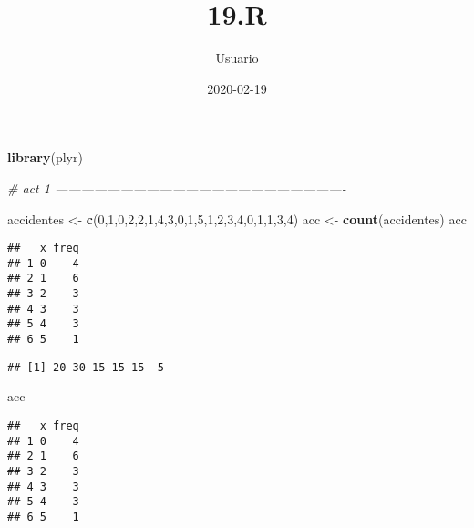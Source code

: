 \documentclass[
]{article}
\title{19.R}
\author{Usuario}
\date{2020-02-19}
\newenvironment{Shaded}{\begin{snugshade}}{\end{snugshade}}
\newcommand{\CommentTok}[1]{\textcolor[rgb]{0.56,0.35,0.01}{\textit{#1}}}
\newcommand{\DecValTok}[1]{\textcolor[rgb]{0.00,0.00,0.81}{#1}}
\newcommand{\KeywordTok}[1]{\textcolor[rgb]{0.13,0.29,0.53}{\textbf{#1}}}
\newcommand{\NormalTok}[1]{#1}
\newcommand{\OperatorTok}[1]{\textcolor[rgb]{0.81,0.36,0.00}{\textbf{#1}}}
\newcommand{\StringTok}[1]{\textcolor[rgb]{0.31,0.60,0.02}{#1}}
\begin{document}
\maketitle

\begin{Shaded}
\begin{Highlighting}[]
\KeywordTok{library}\NormalTok{(plyr)}

\CommentTok{# act 1 -------------------------------------------------------------------}


\NormalTok{accidentes <-}\StringTok{ }\KeywordTok{c}\NormalTok{(}\DecValTok{0}\NormalTok{,}\DecValTok{1}\NormalTok{,}\DecValTok{0}\NormalTok{,}\DecValTok{2}\NormalTok{,}\DecValTok{2}\NormalTok{,}\DecValTok{1}\NormalTok{,}\DecValTok{4}\NormalTok{,}\DecValTok{3}\NormalTok{,}\DecValTok{0}\NormalTok{,}\DecValTok{1}\NormalTok{,}\DecValTok{5}\NormalTok{,}\DecValTok{1}\NormalTok{,}\DecValTok{2}\NormalTok{,}\DecValTok{3}\NormalTok{,}\DecValTok{4}\NormalTok{,}\DecValTok{0}\NormalTok{,}\DecValTok{1}\NormalTok{,}\DecValTok{1}\NormalTok{,}\DecValTok{3}\NormalTok{,}\DecValTok{4}\NormalTok{)}
\NormalTok{acc <-}\StringTok{ }\KeywordTok{count}\NormalTok{(accidentes)}
\NormalTok{acc}
\end{Highlighting}
\end{Shaded}

\begin{verbatim}
##   x freq
## 1 0    4
## 2 1    6
## 3 2    3
## 4 3    3
## 5 4    3
## 6 5    1
\end{verbatim}

\begin{Shaded}
\end{Shaded}

\begin{verbatim}
## [1] 20 30 15 15 15  5
\end{verbatim}

\begin{Shaded}
\begin{Highlighting}[]
\NormalTok{acc}
\end{Highlighting}
\end{Shaded}

\begin{verbatim}
##   x freq
## 1 0    4
## 2 1    6
## 3 2    3
## 4 3    3
## 5 4    3
## 6 5    1
\end{verbatim}
\end{document}
